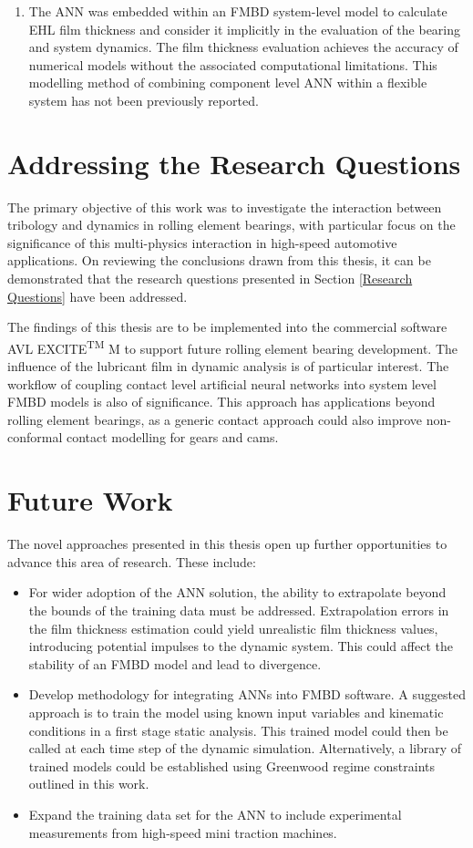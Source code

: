 \begin{enumerate}
	\item The ANN was embedded within an FMBD system-level model to calculate EHL film thickness and consider it implicitly in the evaluation of the bearing and system dynamics. The film thickness evaluation achieves the accuracy of numerical models without the associated computational limitations. This modelling method of combining component level ANN within a flexible system has not been previously reported.
\end{enumerate}

\section{Addressing the Research Questions}
The primary objective of this work was to investigate the interaction between tribology and dynamics in rolling element bearings, with particular focus on the significance of this multi-physics interaction in high-speed automotive applications. On reviewing the conclusions drawn from this thesis, it can be demonstrated that the research questions presented in Section \ref{Research Questions} have been addressed.

The findings of this thesis are to be implemented into the commercial software AVL EXCITE\textsuperscript{TM} M to support future rolling element bearing development. The influence of the lubricant film in dynamic analysis is of particular interest. The workflow of coupling contact level artificial neural networks into system level FMBD models is also of significance. This approach has applications beyond rolling element bearings, as a generic contact approach could also improve non-conformal contact modelling for gears and cams.

\section{Future Work}

The novel approaches presented in this thesis open up further opportunities to advance this area of research. These include:

\begin{itemize}
	\item For wider adoption of the ANN solution, the ability to extrapolate beyond the bounds of the training data must be addressed. Extrapolation errors in the film thickness estimation could yield unrealistic film thickness values, introducing potential impulses to the dynamic system. This could  affect the stability of an FMBD model and lead to divergence.
	\item Develop methodology for integrating ANNs into FMBD software. A suggested approach is to train the model using known input variables and kinematic conditions in a first stage static analysis. This trained model could then be called at each time step of the dynamic simulation. Alternatively, a library of trained models could be established using Greenwood regime constraints outlined in this work.
	\item Expand the training data set for the ANN to include experimental measurements from high-speed mini traction machines.
\end{itemize}